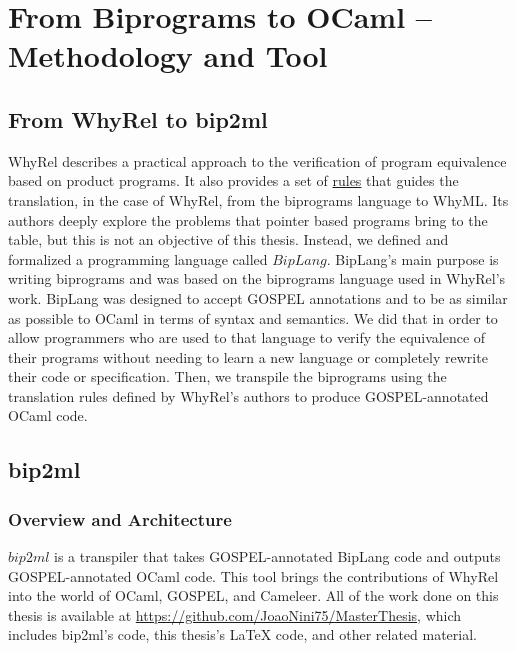 
%

\chapter{From Biprograms to OCaml -- Methodology and Tool}
\label{cha:methodology}


\FloatBarrier
\section{From WhyRel to bip2ml}
\label{sec:whyrel_to_bip2ml}

WhyRel describes a practical approach to the verification of program equivalence based on product programs.
It also provides a set of \hyperref[fig:translation-biprograms-rules]{rules} that guides the translation, in the case of WhyRel, from the biprograms language to WhyML.
Its authors deeply explore the problems that pointer based programs bring to the table, but this is not an objective of this thesis.
Instead, we defined and formalized a programming language called $BipLang$.
BipLang's main purpose is writing biprograms and was based on the biprograms language used in WhyRel's work.
BipLang was designed to accept GOSPEL annotations and to be as similar as possible to OCaml in terms of syntax and semantics.
We did that in order to allow programmers who are used to that language to verify the equivalence of their programs without needing to learn a new language or completely rewrite their code or specification.
Then, we transpile the biprograms using the translation rules defined by WhyRel's authors to produce GOSPEL-annotated OCaml code.


\FloatBarrier
\section{bip2ml}
\label{sec:bip2ml}

\FloatBarrier
\subsection{Overview and Architecture}
\label{subsec:bip2ml_overview}

$bip2ml$ is a transpiler that takes GOSPEL-annotated BipLang code and outputs GOSPEL-annotated OCaml code.
This tool brings the contributions of WhyRel into the world of OCaml, GOSPEL, and Cameleer.
All of the work done on this thesis is available at \url{https://github.com/JoaoNini75/MasterThesis}, which includes bip2ml's code, this thesis's LaTeX code, and other related material.

